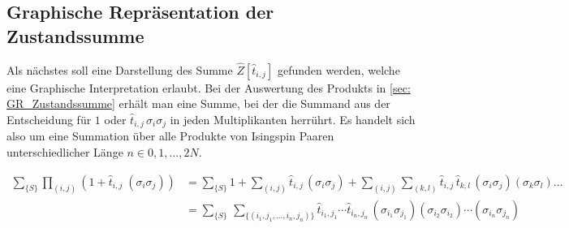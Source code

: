 \subsection{Graphische Repräsentation der Zustandssumme} \label{sec: GR_Zustandssumme}

Als nächstes soll eine Darstellung des Summe $\hat{Z}[\hat{t}_{i,j}]$ gefunden werden, welche eine Graphische Interpretation erlaubt. Bei der Auswertung des Produkts in \eqref{sec: GR_Zustandssumme} erhält man eine Summe, bei der die Summand aus der Entscheidung für $1$ oder $\hat{t}_{i,j}\,\sigma_i \sigma_j$ in jeden Multiplikanten herrührt. Es handelt sich also um eine Summation über alle Produkte von Isingspin Paaren unterschiedlicher Länge $n \in {0,1,\dots ,2N}$. 

\begin{align}
\sum_{\{S\}} \prod_{(i,j)} (1 +  \hat{t}_{i,j} \; (\sigma_i \sigma_j)) 
&= 
\sum_{\{S\}} 1 + \sum_{(i,j)} \hat{t}_{i,j}\,(\sigma_i \sigma_j) + \sum_{(i,j)}\sum_{(k,l)} \hat{t}_{i,j}\, \hat{t}_{k,l}\,(\sigma_i \sigma_j)  (\sigma_k \sigma_l) \dots \\
&= \sum_{\{S\}} \, \sum_{\{(i_1,j_1,...,i_n,j_n)\}} \hat{t}_{i_1,j_1} \cdots \hat{t}_{i_n,j_n} \, (\sigma_{i_1} \sigma_{j_1})(\sigma_{i_2} \sigma_{i_2}) \cdots (\sigma_{i_n} \sigma_{j_n})
\end{align}

